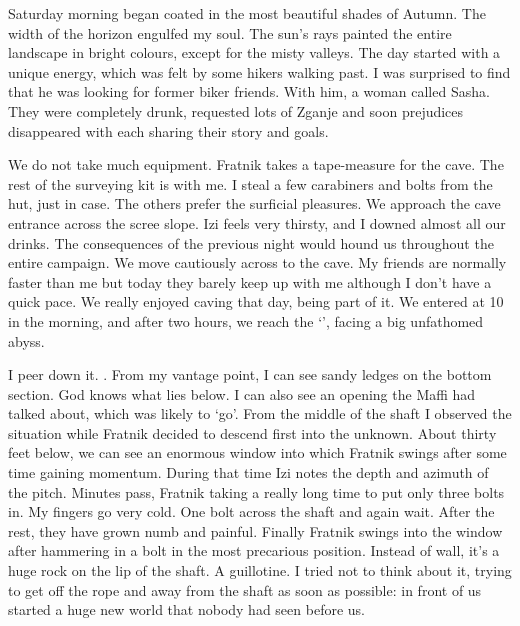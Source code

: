 Saturday morning began coated in the most beautiful shades of Autumn. The width of the horizon engulfed my soul. The sun's rays painted the entire landscape in bright colours, except for the misty valleys. The day started with a unique energy, which was felt by some hikers walking past. I was surprised to find that he was looking for former biker friends. With him, a woman called Sasha. They were completely drunk, requested lots of Zganje and soon prejudices disappeared with each sharing their story and goals.

We do not take much equipment. Fratnik takes a tape-measure for the cave. The rest of the surveying kit is with me. I steal a few carabiners and bolts from the hut, just in case. The others prefer the surficial pleasures. We approach the cave entrance across the scree slope. Izi feels very thirsty, and I downed almost all our drinks. The consequences of the previous night would hound us throughout the entire campaign. We move cautiously across to the cave.  My friends are normally faster than me but today they barely keep up with me although I don't have a quick pace. We really enjoyed caving that day, being part of it. We entered  at 10 in the morning, and after two hours, we reach the `', facing a big unfathomed abyss.

 I peer down it. . From my vantage point, I can see sandy ledges on the bottom section. God knows what lies below. I can also see an opening the Maffi had talked about, which was likely to `go'. From the middle of the shaft I observed the situation while Fratnik decided to descend first into the unknown. About thirty feet below, we can see an enormous window into which Fratnik swings after some time gaining momentum. During that time Izi notes the depth and azimuth of the pitch. Minutes pass, Fratnik taking a really long time to put only three bolts in. My fingers go very cold. One bolt across the shaft and again wait. After the rest, they have grown numb and painful. Finally Fratnik swings into the window after hammering in a bolt in the most precarious position. Instead of wall, it's a huge rock on the lip of the shaft. A guillotine.  I tried not to think about it, trying to get off the rope and away from the shaft as soon as possible: in front of us started a huge new world that nobody had seen before us. 

